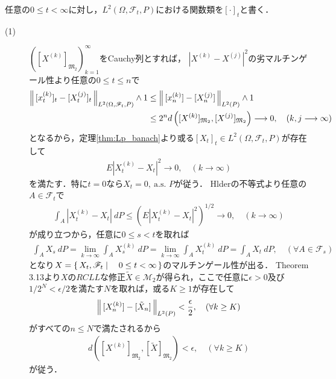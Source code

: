 	\begin{prf} 任意の$0 \leq t < \infty$に対し，$L^2(\Omega,\mathscr{F}_t,P)$における関数類を$[\cdot]_t$と書く．
		\begin{description}
			\item[(1)] $\left([X^{(k)}]_{\mathfrak{M}_2}\right)_{k=1}^\infty$をCauchy列とすれば，
				$|X^{(k)} - X^{(j)}|^2$の劣マルチンゲール性より任意の$0 \leq t \leq n$で
				\begin{align}
					\left\|\, [x^{(k)}_t]_t - [X^{(j)}_t]_t\, \right\|_{L^2(\Omega,\mathscr{F}_t,P)} \wedge 1
					&\leq \left\|\, [x^{(k)}_n] - [X^{(j)}_n]\, \right\|_{L^2(P)} \wedge 1 \\
					&\leq 2^n d\left( [X^{(k)}]_{\mathfrak{M}_2}, [X^{(j)}]_{\mathfrak{M}_2}\right)
					\longrightarrow 0,
					\quad (k,j \longrightarrow \infty)
				\end{align}
				となるから，定理\ref{thm:Lp_banach}より或る$[X_t]_t \in L^2(\Omega,\mathscr{F}_t,P)$が存在して
				\begin{align}
					E \left|X^{(k)}_t - X_t\right|^2 \longrightarrow 0,
					\quad (k \longrightarrow \infty)
				\end{align}
				を満たす．特に$t = 0$なら$X_t = 0,\ \mbox{a.s. $P$}$が従う．
				Hlderの不等式より任意の$A \in \mathscr{F}_t$で
				\begin{align}
					\int_A \left|X^{(k)}_t - X_t\right|\ dP
					\leq \left( E \left|X^{(k)}_t - X_t\right|^2 \right)^{1/2}
					\longrightarrow 0,
					\quad (k \longrightarrow \infty)
				\end{align}
				が成り立つから，任意に$0 \leq s < t$を取れば
				\begin{align}
					\int_A X_s\ dP
					= \lim_{k \to \infty} \int_A X^{(k)}_s\ dP
					= \lim_{k \to \infty} \int_A X^{(k)}_t\ dP
					= \int_A X_t\ dP,
					\quad (\forall A \in \mathscr{F}_s)
				\end{align}
				となり$X = \left\{\, X_t,\mathscr{F}_t \mid \quad 0 \leq t < \infty\, \right\}$のマルチンゲール性が出る．
				Theorem 3.13より$X$の$RCLL$な修正$\tilde{X} \in \mathscr{M}_2$が得られ，ここで任意に$\epsilon > 0$及び
				$1/2^N < \epsilon/2$を満たす$N$を取れば，或る$K \geq 1$が存在して
				\begin{align}
					\left\|\, [X^{(k)}_n] - [\tilde{X}_n]\, \right\|_{L^2(P)} < \frac{\epsilon}{2},
					\quad (\forall k \geq K)
				\end{align}
				がすべての$n \leq N$で満たされるから
				\begin{align}
					d\left([X^{(k)}]_{\mathfrak{M}_2}, [\tilde{X}]_{\mathfrak{M}_2}\right) < \epsilon,
					\quad (\forall k \geq K)
				\end{align}
				が従う．
		\end{description}
	\end{prf}